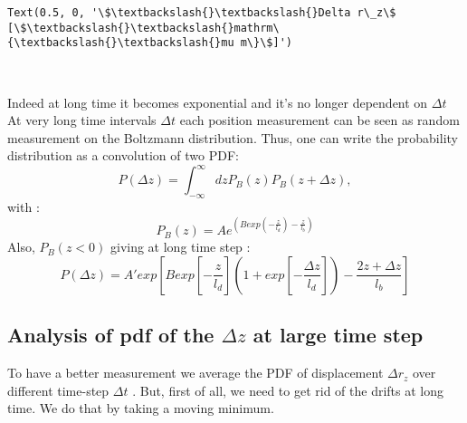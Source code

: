 \documentclass[11pt]{article}
\makeatletter
\newcommand{\boxspacing}{\kern\kvtcb@left@rule\kern\kvtcb@boxsep}
\newcommand{\prompt}[4]{
        {\ttfamily\llap{{\color{#2}[#3]:\hspace{3pt}#4}}\vspace{-\baselineskip}}
    }
\makeatother
\begin{document}
            \begin{tcolorbox}[breakable, size=fbox, boxrule=.5pt, pad at break*=1mm, opacityfill=0]
\prompt{Out}{outcolor}{19}{\boxspacing}
\begin{Verbatim}[commandchars=\\\{\}]
Text(0.5, 0, '\$\textbackslash{}\textbackslash{}Delta r\_z\$ [\$\textbackslash{}\textbackslash{}mathrm\{\textbackslash{}\textbackslash{}mu m\}\$]')
\end{Verbatim}
\end{tcolorbox}
        
    \begin{center}
    \end{center}
    { \hspace*{\fill} \\}
    
    Indeed at long time it becomes exponential and it's no longer dependent
on \(\Delta t\) At very long time intervals \(\Delta t\) each position
measurement can be seen as random measurement on the Boltzmann
distribution. Thus, one can write the probability distribution as a
convolution of two PDF:
\begin{equation} P(\Delta z) = \int ^ \infty _{- \infty} dz P_B (z)P_B (z + \Delta z), \end{equation}
with :
\begin{equation} P_B(z) = Ae^{\left(Bexp\left(-\frac{z}{l_d}\right) - \frac{z}{l_b}\right)} \end{equation}
Also, \(P_B(z < 0)\) giving at long time step :
\begin{equation} P(\Delta z) = A'exp \left[Bexp\left[-\frac{z}{l_d}\right] (1 + exp[- \frac{\Delta z}{ l_d}]) - \frac{ 2z + \Delta z}{l_b} \right] \end{equation}

    \hypertarget{analysis-of-pdf-of-the-delta-z-at-large-time-step}{%
\subsection{\texorpdfstring{Analysis of pdf of the \(\Delta z\) at large
time
step}{Analysis of pdf of the \textbackslash Delta z at large time step}}\label{analysis-of-pdf-of-the-delta-z-at-large-time-step}}

To have a better measurement we average the PDF of displacement
\(\Delta r_z\) over different time-step \(\Delta t\) . But, first of
all, we need to get rid of the drifts at long time. We do that by taking
a moving minimum.
\end{document}
